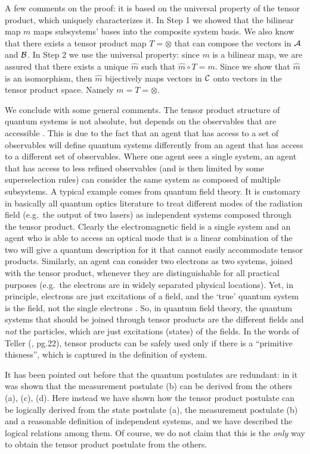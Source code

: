 \documentclass[aps,prl,amsmath,amssymb,twocolumn,nofootinbib]{revtex4}
\theoremstyle{plain}
\theoremstyle{definition}
\theoremstyle{remark}
\begin{document}
\baselineskip A few comments on the proof: it is based on the
universal property of the tensor product, which uniquely characterizes
it. In Step 1 we showed that the bilinear map $m$ maps subsystems'
bases into the composite system basis. We also know that there exists a
tensor product map $ {T}=\otimes$ that can compose the vectors in $\cal A$
and $\cal B$. In Step 2 we use the universal property: since $m$ is a
bilinear map, we are assured that there exists a unique $\hat m$ such
that $\hat m \circ T=m$. Since we show that $\hat m$ is an
isomorphism, then $\hat{m}$ bijectively maps vectors in $\cal C$
onto vectors in the tensor product space. Namely $m={T}=\otimes$.

We conclude with some general comments. The tensor product structure
of quantum systems is not absolute, but depends on the observables
that are accessible \cite{zanardi,zanardilloyd}. This is due to the
fact that an agent that has access to a set of observables will define
quantum systems differently from an agent that has access to a
different set of observables. Where one agent sees a single system, an
agent that has access to less refined observables (and is then limited
by some superselection rules) can consider the same system as composed
of multiple subsystems. A typical example \cite{tellerbook} comes from
quantum field theory. It is customary in basically all quantum optics
literature to treat different modes of the radiation field (e.g.~the
output of two lasers) as independent systems composed through the
tensor product.  Clearly the electromagnetic field is a single system
and an agent who is able to access an optical mode that is a linear
combination of the two will give a quantum description for it that
cannot easily accommodate tensor products. Similarly, an agent can
consider two electrons as two systems, joined with the tensor product,
whenever they are distinguishable for all practical purposes (e.g.~the
electrons are in widely separated physical locations). Yet, in
principle, electrons are just excitations of a field, and the `true'
quantum system is the field, not the single electrons
\cite{teller,tellerbook}.  So, in quantum field theory, the quantum
systems that should be joined through tensor products are the
different fields and {\em not} the particles, which are just
excitations (states) of the fields. In the words of Teller
(\cite{tellerbook}, pg.22), tensor products can be safely used only if
there is a ``primitive thisness'', which is captured in the definition
of system.


It has been pointed out before that the quantum postulates are
redundant: in \cite{masanes} it was shown that the measurement
postulate (b) can be derived from the others (a), (c), (d). Here
instead we have shown how the tensor product postulate can be
logically derived from the state postulate (a), the measurement
postulate (b) and a reasonable definition of independent systems, and
we have described the logical relations among them.  Of course, we do
not claim that this is the {\em only} way to obtain the tensor product
postulate from the others.
\end{document}
